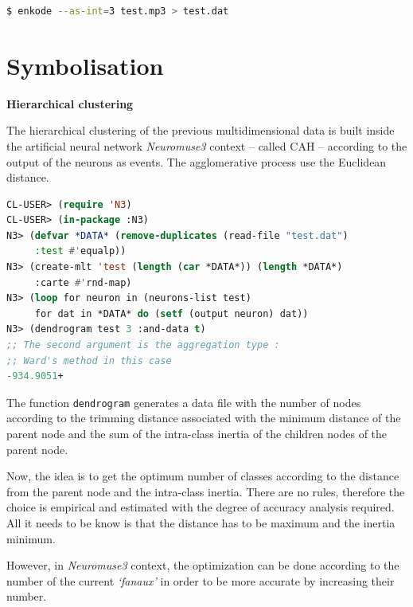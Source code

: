 \smallskip

\begin{lstlisting}[language=bash]
$ enkode --as-int=3 test.mp3 > test.dat
\end{lstlisting}

\section{Symbolisation}
\label{sym}

\textbf{Hierarchical clustering}
\smallskip

The hierarchical clustering of the previous multidimensional data is built inside the artificial neural network \textsl{Neuromuse3} context -- called CAH -- according to the output of the neurons as events. The agglomerative process use the Euclidean distance.

\smallskip

\begin{lstlisting}[language=Lisp]
CL-USER> (require 'N3)
CL-USER> (in-package :N3)
N3> (defvar *DATA* (remove-duplicates (read-file "test.dat") 
     :test #'equalp))
N3> (create-mlt 'test (length (car *DATA*)) (length *DATA*) 
     :carte #'rnd-map)
N3> (loop for neuron in (neurons-list test) 
     for dat in *DATA* do (setf (output neuron) dat))
N3> (dendrogram test 3 :and-data t)
;; The second argument is the aggregation type :
;; Ward's method in this case
-934.9051+
\end{lstlisting}

\smallskip

The function \texttt{dendrogram} generates a data file with the number of nodes according to the trimming distance associated with the minimum distance of the parent node and the sum of the intra-class inertia of the children nodes of the parent node.

Now, the idea is to get the optimum number of classes according to the distance from the parent node and the intra-class inertia. There are no rules, therefore the choice is empirical and estimated with the degree of accuracy analysis required. All it needs to be know is that the distance has to be maximum and the inertia minimum.

However, in \textsl{Neuromuse3} context, the optimization can be done according to the number of the current \textit{`fanaux'} in order to be more accurate by increasing their number.

